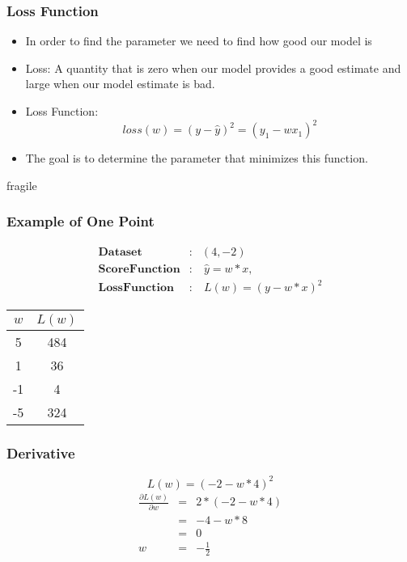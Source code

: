 \documentclass[14 pt]{beamer}
\let\olditem\item
\renewcommand{\item}{\olditem\vspace{4pt}}
\begin{document}
\begin{frame}
  \frametitle{Loss Function}
  \begin{itemize}
  \item In order to find the parameter we need to find how good our model
    is
  \item Loss: A quantity that is zero when our model provides a good
    estimate and large when our model estimate is bad.
  \item Loss Function:
  \begin{equation*}
    loss(w) = (y-\hat{y})^2 = (y_1 - wx_1)^2
  \end{equation*}
\item The goal is to determine the parameter that minimizes this function.
\end{itemize}
\end{frame}

\begin{frame}{fragile}
  \frametitle{Example of One Point}
  \begin{displaymath}
\begin{array}{lll}
\mathbf{Dataset} & : &  (4, -2) \\
   \mathbf{Score Function} & : &  \ \hat{y}  =   w*x,  \\
\mathbf{Loss Function} & : &  \ L(w)  =  (y - w*x)^2 
\end{array}
\end{displaymath}
\begin{table}
  \begin{tabular}{|c|c|}
\hline
$w$ & $L(w)$ \\
\hline
5 & 484 \\
\hline
1 & 36 \\
\hline
-1 & 4 \\
\hline
-5 & 324 \\
\hline
  \end{tabular}
\end{table}
\end{frame}

\begin{frame}
  \frametitle{Derivative}
  \begin{equation*}
    L(w)=(-2-w*4)^2
  \end{equation*}
  \begin{displaymath}
\begin{array}{lll}
    \frac{\partial L(w)}{\partial w} & = & 2*(-2 - w*4) \\
    & =  & -4-w*8 \\ 
  & = & 0 \\
  w & = & -\frac{1}{2}\\
  \end{array}
\end{displaymath}
\end{frame}
\end{document}
